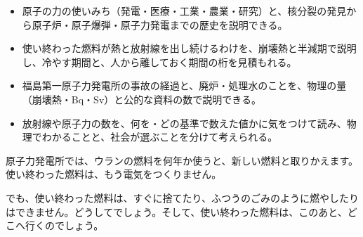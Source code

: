 
\begin{goal}
\begin{itemize}[label={\color{bkTheme}●}, leftmargin=1.6\zw, itemsep=0pt, topsep=1pt]
\item {}\enspace 原子の力の使いみち（発電・医療・工業・農業・研究）と、核分裂の発見から原子炉・原子爆弾・原子力発電までの歴史を説明できる。
\item {}\enspace 使い終わった燃料が熱と放射線を出し続けるわけを、崩壊熱と半減期で説明し、冷やす期間と、人から離しておく期間の桁を見積もれる。
\item {}\enspace 福島第一原子力発電所の事故の経過と、廃炉・処理水のことを、物理の量（崩壊熱・Bq・Sv）と公的な資料の数で説明できる。
\item {}\enspace 放射線や原子力の数を、何を・どの基準で数えた値かに気をつけて読み、物理でわかることと、社会が選ぶことを分けて考えられる。
\end{itemize}
\end{goal}

\begin{hatena}
\noindent\begin{minipage}[c]{0.55\linewidth}\raggedright
原子力発電所では、ウランの燃料を何年か使うと、新しい燃料と取りかえます。使い終わった燃料は、もう電気をつくりません。\par\vspace{3pt}
でも、使い終わった燃料は、すぐに捨てたり、ふつうのごみのように燃やしたりはできません。どうしてでしょう。そして、使い終わった燃料は、このあと、どこへ行くのでしょう。
\end{minipage}\hfill
\begin{minipage}[c]{0.42\linewidth}\centering
{}
\end{minipage}
\end{hatena}

